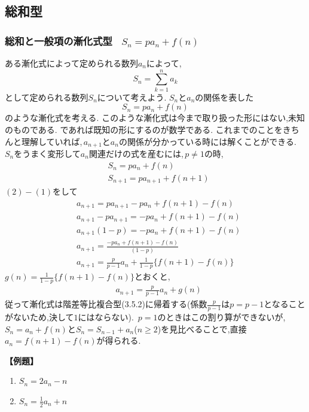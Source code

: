 
\subsection{総和型}
  \subsubsection{総和と一般項の漸化式型 \, $S_n=pa_n+f(n)$}
    ある漸化式によって定められる数列$a_n$によって,
    \[
      S_n=\sum_{k=1}^{n} a_k
    \]
    として定められる数列$S_n$について考えよう.
    $S_n$と$a_n$の関係を表した
    \[
      S_n=pa_n+f(n)
    \]
    のような漸化式を考える.
    このような漸化式は今まで取り扱った形にはない,未知のものである.
    であれば既知の形にするのが数学である.
    これまでのことをきちんと理解していれば,\,$a_{n+1}$と$a_n$の関係が分かっている時には解くことができる.
    $S_n$をうまく変形して$a_{n}$関連だけの式を産むには,\,$p \neq 1$の時,
    \begin{align*}
      &S_n=pa_n+f(n) \tag*{\(\cdots\) (1)}\\
      &S_{n+1}=pa_{n+1}+f(n+1) \tag*{\(\cdots\) (2)}
    \end{align*}
    $(2)-(1)$をして
    \begin{align*}
      &a_{n+1}=pa_{n+1}-pa_n+f(n+1)-f(n)\\
      &a_{n+1}-pa_{n+1}=-pa_n+f(n+1)-f(n)\\
      &a_{n+1}(1-p)=-pa_n+f(n+1)-f(n)\\
      &a_{n+1}=\frac{-pa_n+f(n+1)-f(n)}{(1-p)}\\
      &a_{n+1}=\frac{p}{p-1}a_n+\frac{1}{1-p}\{f(n+1)-f(n)\}
    \end{align*}
    $\displaystyle g(n)=\frac{1}{1-p}\{f(n+1)-f(n)\}$とおくと,
    \begin{align*}
      &a_{n+1}=\frac{p}{p-1}a_n+g(n)
    \end{align*}
    従って漸化式は階差等比複合型(3.5.2)に帰着する(係数$\frac{p}{p-1}$は$p=p-1$となることがないため,決して$1$にはならない).
    \,$p=1$のときはこの割り算ができないが,\,$S_n=a_n+f(n)$と$S_n=S_{n-1}+a_n$($n\ge2$)を見比べることで,直接$a_n=f(n+1)-f(n)$が得られる.

    \noindent \textbf{【例題】}
    \begin{enumerate}[label=(\arabic*),parsep=3pt]
      \item $\displaystyle S_n=2a_n-n$
      \item $\displaystyle S_n=\frac12a_n+n$
    \end{enumerate}

